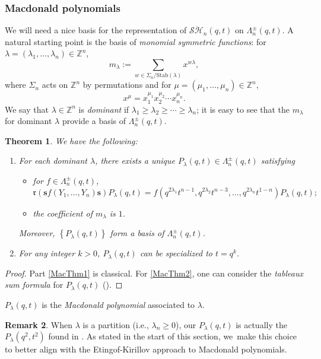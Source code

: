 \documentclass[JEP,XML,SOM,Unicode,published]{cedram}
\newtheorem{thm}{Theorem}[section]
\theoremstyle{definition}
\newtheorem{rem}[thm]{Remark}
\newcommand{\ZZ}{\mathbb{Z}}
\newcommand{\SHH}{\mathcal{S}\ddot{\mathcal{H}}}
\newcommand{\ee}{\boldsymbol{s}}
\newcommand{\rrr}{\mathfrak{r}}
\begin{document}
\subsubsection{Macdonald polynomials}
We will need a nice basis for the representation of $\SHH_n(q,t)$ on $\Lambda^\pm_n(q,t)$.
A natural starting point is the basis of \textit{monomial symmetric functions}: for $\lambda=(\lambda_1,\ldots, \lambda_n)\in\ZZ^n$,
\[
m_\lambda:=\sum_{w\in\Sigma_n/\mathrm{Stab}(\lambda)}x^{w\lambda},
\]
where $\Sigma_n$ acts on $\ZZ^n$ by permutations and for $\mu=(\mu_1,\ldots, \mu_n)\in\ZZ^n$,
\[
x^\mu=x_1^{\mu_1}x_2^{\mu_2}\cdots x_n^{\mu_n}.
\]
We say that $\lambda\in\ZZ^n$ is \textit{dominant} if $\lambda_1\ge\lambda_2\ge\cdots\ge\lambda_n$; it is easy to see that the $m_\lambda$ for dominant $\lambda$ provide a basis of $\Lambda_n^\pm(q,t)$.
\begin{thm}\label{MacThm}
We have the following:
\begin{enumerate}
\item\label{MacThm1} For each dominant $\lambda$, there exists a unique $P_\lambda(q,t)\in\Lambda_n^\pm(q,t)$ satisfying
\begin{itemize}
\item for $f\in\Lambda_n^\pm(q,t)$,
\[
\rrr\left(\ee f(Y_1,\ldots, Y_n)\ee \right)P_\lambda(q,t)=f\left(q^{2\lambda_1}t^{n-1},q^{2\lambda_2}t^{n-3},\ldots,q^{2\lambda_n}t^{1-n}\right)P_\lambda(q,t);
\]
\item the coefficient of $m_\lambda$ is $1$.
\end{itemize}
Moreover, $\left\{ P_\lambda(q,t) \right\}$ form a basis of $\Lambda_n^\pm(q,t)$.
\item\label{MacThm2} For any integer $k>0$, $P_\lambda(q,t)$ can be specialized to $t=q^k$.
\end{enumerate}
\end{thm}

\begin{proof}
Part \eqref{MacThm1} is classical.
For \eqref{MacThm2}, one can consider the \textit{tableaux sum formula} for $P_\lambda(q,t)$ (\cf \cite[VI.6]{MacBook}).
\end{proof}

$P_\lambda(q,t)$ is the \textit{Macdonald polynomial} associated to $\lambda$.

\begin{rem}
When $\lambda$ is a partition (i.e., $\lambda_n\ge 0$), our $P_\lambda(q,t)$ is actually the $P_\lambda(q^2,t^2)$ found in \cite{MacBook}.
As stated in the start of this section, we~make this choice to better align with the Etingof-Kirillov approach to Macdonald polynomials.
\end{rem}
\end{document}
